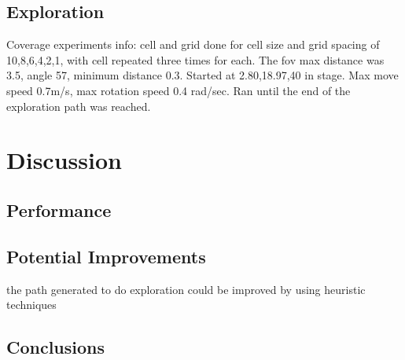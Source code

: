 \documentclass[conference]{IEEEtran}
\begin{document}
\subsection{Exploration}
Coverage experiments info: cell and grid done for cell size and grid spacing of 10,8,6,4,2,1, with cell repeated three times for each. The fov max distance was 3.5, angle 57, minimum distance 0.3. Started at 2.80,18.97,40 in stage. Max move speed 0.7m/s, max rotation speed 0.4 rad/sec. Ran until the end of the exploration path was reached.
\section{Discussion}
\subsection{Performance}
\subsection{Potential Improvements}
the path generated to do exploration could be improved by using heuristic techniques
\subsection{Conclusions}


\end{document}
